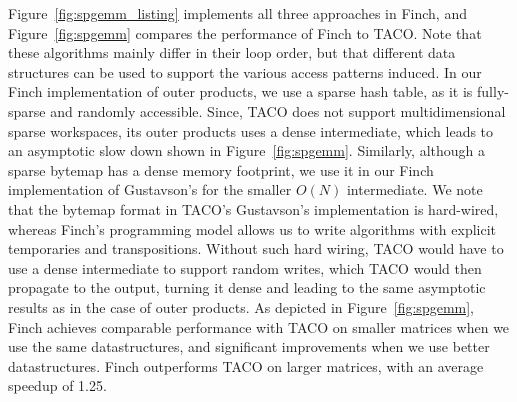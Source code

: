 Figure~\ref{fig:spgemm_listing} implements all three approaches in Finch, and Figure~\ref{fig:spgemm} compares the performance of Finch to TACO.
%
Note that these algorithms mainly differ in their loop order, but that different data structures can be used to support the various access patterns induced.
%
In our Finch implementation of outer products, we use a sparse hash table, as it is fully-sparse and randomly accessible.
%
Since, TACO does not support multidimensional sparse workspaces, its outer products uses a dense intermediate, which leads to an asymptotic slow down shown in Figure~\ref{fig:spgemm}.
%
Similarly, although a sparse bytemap has a dense memory footprint, we use it in our Finch implementation of Gustavson's for the smaller $O(N)$ intermediate.
%
We note that the bytemap format in TACO's Gustavson's implementation is hard-wired, whereas Finch's programming model allows us to write algorithms with explicit temporaries and transpositions.
%
Without such hard wiring, TACO would have to use a dense intermediate to support random writes, which TACO would then propagate to the output, turning it dense and leading to the same asymptotic results as in the case of outer products. 
%
As depicted in Figure~\ref{fig:spgemm}, Finch achieves comparable performance with TACO on smaller matrices when we use the same datastructures, and significant improvements when we use better datastructures. 
%
Finch outperforms TACO on larger matrices, with an average speedup of 1.25. %


